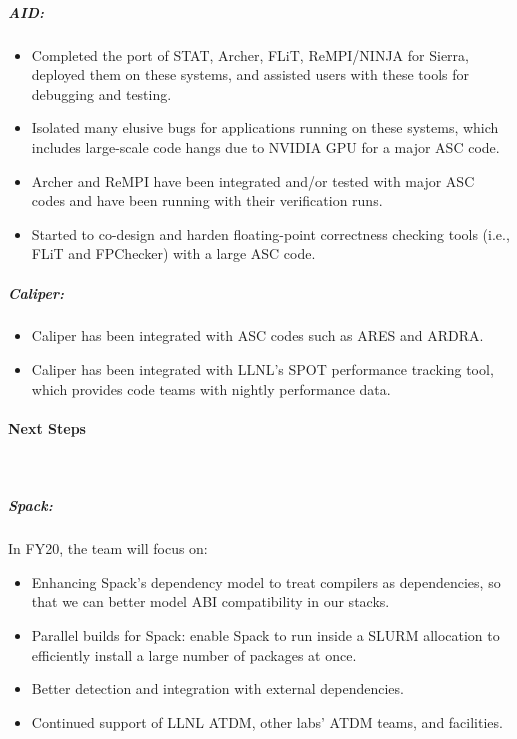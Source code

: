 \subparagraph{AID:}
\begin{itemize}

\item Completed the port of STAT, Archer, FLiT, ReMPI/NINJA for Sierra,
    deployed them on these systems, and assisted users with these tools for
    debugging and testing.

\item Isolated many elusive bugs for applications running on these systems,
    which includes large-scale code hangs due to NVIDIA GPU for a major ASC code.

\item Archer and ReMPI have been integrated and/or tested with major ASC codes
    and have been running with their verification runs.

\item Started to co-design and harden floating-point correctness checking tools
    (i.e., FLiT and FPChecker) with a large ASC code.

\end{itemize}

\subparagraph{Caliper:}
\begin{itemize}
\item Caliper has been integrated with ASC codes such as ARES and ARDRA.
\item Caliper has been integrated with LLNL's SPOT performance tracking tool,
      which provides code teams with nightly performance data.
\end{itemize}


\paragraph{Next Steps} \leavevmode \\

\subparagraph{Spack:}
In FY20, the team will focus on:

\begin{itemize}
    \item Enhancing Spack's dependency model to treat compilers as
    dependencies, so that we can better model ABI compatibility in our
    stacks.

    \item Parallel builds for Spack: enable Spack to run inside a SLURM
    allocation to efficiently install a large number of packages at once.

    \item Better detection and integration with external dependencies.

    \item Continued support of LLNL ATDM, other labs' ATDM teams, and
          facilities.
\end{itemize}

